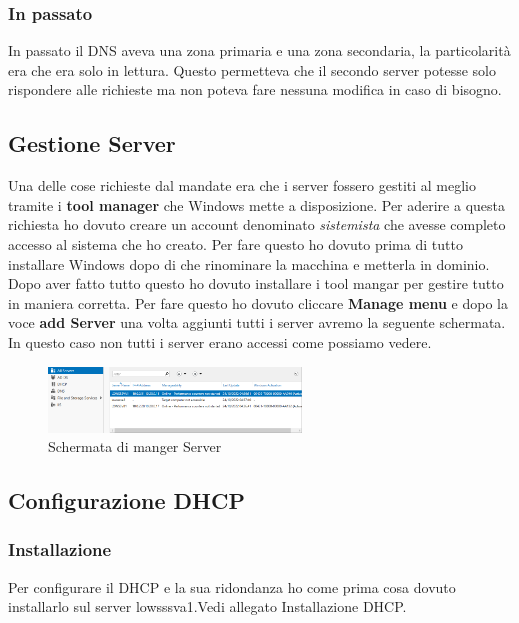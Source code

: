 \documentclass[../main.tex]{subfiles}
\begin{document}
\subsubsection{In passato }
In passato il DNS aveva una zona primaria e una zona secondaria, la particolarità era che era solo in lettura. Questo permetteva che il secondo server potesse solo rispondere alle richieste ma non poteva fare nessuna modifica in caso di bisogno.


\pagebreak{}
\thispagestyle{header-pages}

\subsection{Gestione Server}
Una delle cose richieste dal mandate era che i server fossero gestiti al meglio tramite i \textbf{tool manager} che Windows mette a disposizione. Per aderire a questa richiesta ho dovuto creare un account denominato \textit{sistemista} che avesse completo accesso al sistema che ho creato. Per fare questo ho dovuto prima di tutto installare Windows dopo di che rinominare la macchina e metterla in dominio. Dopo aver fatto tutto questo ho dovuto installare i tool mangar per gestire tutto in maniera corretta. Per fare questo ho dovuto cliccare \textbf{Manage menu} e dopo la voce  \textbf{add Server} una volta aggiunti tutti i server avremo la seguente schermata. In questo caso non tutti i server erano accessi come possiamo vedere.

\begin{figure}[h]
    \centering
    \includegraphics[width=0.6\textwidth]{Images/gestioneServer.png}
    \caption{Schermata di manger Server}
\end{figure}


\subsection{Configurazione DHCP}
\subsubsection{Installazione}
Per configurare il DHCP e la sua ridondanza ho come prima cosa dovuto installarlo sul server lowsssva1.Vedi allegato Installazione DHCP.
\end{document}

